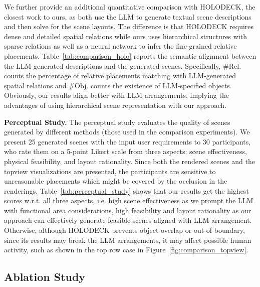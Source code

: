 

We further provide an additional quantitative comparison with HOLODECK, the closest work to ours, as both use the LLM to generate textual scene descriptions and then solve for the scene layouts. The difference is that HOLODECK requires dense and detailed spatial relations while ours uses hierarchical structures with sparse relations as well as a neural network to infer the fine-grained relative placements. Table~\ref{tab:comparison_holo} reports the semantic alignment between the LLM-generated descriptions and the generated scenes. Specifically, $\#$Rel. counts the percentage of relative placements matching with LLM-generated spatial relations and $\#$Obj. counts the existence of LLM-specified objects. Obviously, our results align better with LLM arrangements, implying the advantages of using hierarchical scene representation with our approach.



\noindent\textbf{Perceptual Study.} The perceptual study evaluates the quality of scenes generated by different methods (those used in the comparison experiments). We present 25 generated scenes with the input user requirements to 30 participants, who rate them on a 5-point Likert scale from three aspects: scene effectiveness, physical feasibility, and layout rationality. Since both the rendered scenes and the topview visualizations are presented, the participants are sensitive to unreasonable placements which might be covered by the occlusion in the renderings. Table~\ref{tab:perceptual_study} shows that our results get the highest scores w.r.t. all three aspects, i.e. high scene effectiveness as we prompt the LLM with functional area considerations, high feasibility and layout rationality as our approach can effectively generate feasible scenes aligned with LLM arrangement. Otherwise, although HOLODECK prevents object overlap or out-of-boundary, since its results may break the LLM arrangements, it may affect possible human activity, such as shown in the top row case in Figure~\ref{fig:comparison_topview}.




\subsection{Ablation Study}

